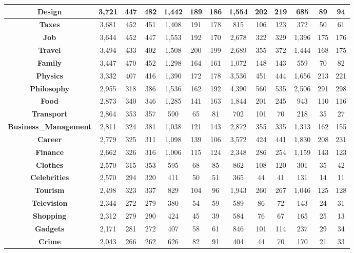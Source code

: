 \begin{table}[t]
{\begin{tabular}{|c||c|c|c||c|c|c||c|c|c||c|c|c|}
\textbf{Design} & 3,721 & 447 & 482 & 1,442 & 189 & 186 & 1,554 & 202 & 219 & 685 & 89 & 94\\ \hline
\textbf{Taxes} & 3,681 & 452 & 451 & 1,408 & 191 & 178 & 815 & 106 & 123 & 372 & 50 & 61\\ \hline
\textbf{Job} & 3,644 & 452 & 447 & 1,553 & 192 & 170 & 2,678 & 322 & 329 & 1,396 & 175 & 176\\ \hline
\textbf{Travel} & 3,494 & 433 & 402 & 1,508 & 200 & 199 & 2,689 & 355 & 372 & 1,444 & 168 & 175\\ \hline
\textbf{Family} & 3,447 & 470 & 452 & 1,298 & 164 & 161 & 1,072 & 148 & 143 & 559 & 70 & 82\\ \hline
\textbf{Physics} & 3,332 & 407 & 416 & 1,390 & 172 & 178 & 3,536 & 451 & 444 & 1,656 & 213 & 221\\ \hline
\textbf{Philosophy} & 2,955 & 318 & 386 & 1,536 & 162 & 192 & 4,390 & 560 & 535 & 2,506 & 291 & 298\\ \hline
\textbf{Food} & 2,873 & 340 & 346 & 1,285 & 141 & 163 & 1,844 & 201 & 245 & 943 & 110 & 116\\ \hline
\textbf{Transport} & 2,864 & 353 & 357 & 590 & 65 & 81 & 702 & 101 & 70 & 218 & 35 & 27\\ \hline
\textbf{Business\_Management} & 2,811 & 324 & 381 & 1,038 & 121 & 143 & 2,872 & 355 & 335 & 1,313 & 162 & 155\\ \hline
\textbf{Career} & 2,779 & 325 & 311 & 1,098 & 139 & 106 & 3,572 & 424 & 441 & 1,830 & 208 & 231\\ \hline
\textbf{Finance} & 2,662 & 326 & 316 & 1,006 & 115 & 124 & 2,348 & 286 & 254 & 1,159 & 143 & 123\\ \hline
\textbf{Clothes} & 2,570 & 315 & 353 & 595 & 68 & 85 & 862 & 108 & 120 & 301 & 35 & 42\\ \hline
\textbf{Celebrities} & 2,570 & 294 & 320 & 411 & 50 & 51 & 365 & 44 & 41 & 131 & 14 & 11\\ \hline
\textbf{Tourism} & 2,498 & 323 & 337 & 829 & 104 & 96 & 1,943 & 260 & 267 & 1,046 & 125 & 128\\ \hline
\textbf{Television} & 2,344 & 272 & 279 & 380 & 54 & 59 & 589 & 86 & 72 & 143 & 24 & 31\\ \hline
\textbf{Shopping} & 2,312 & 279 & 290 & 424 & 45 & 39 & 584 & 76 & 67 & 165 & 25 & 13\\ \hline
\textbf{Gadgets} & 2,171 & 281 & 272 & 407 & 58 & 61 & 846 & 101 & 114 & 237 & 29 & 34\\ \hline
\textbf{Crime} & 2,043 & 266 & 262 & 626 & 82 & 91 & 404 & 44 & 70 & 170 & 21 & 33\\ \hline

\end{tabular}}
\end{table}
